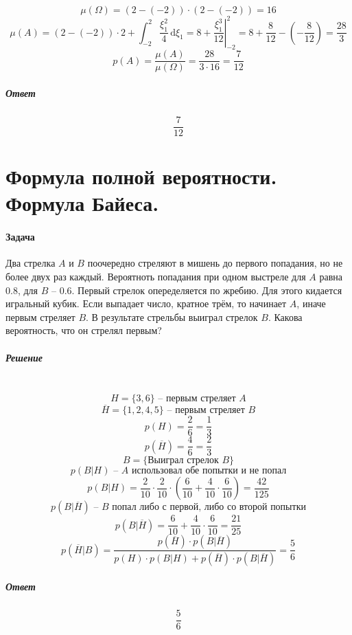 \documentclass[fleqn, 10pt]{article}
\begin{document}
\[\mu(\Omega) = (2 - (-2))\cdot(2 - (-2)) = 16\]
\[\mu(A) = (2 - (-2))\cdot 2 + \int_{-2}^{2}\frac{\xi_1^2}{4}\,\mathrm{d}\xi_1 = 8 + \left.\frac{\xi_1^3}{12}\right|_{-2}^2 = 8 + \frac{8}{12} - (-\frac{8}{12}) = \frac{28}{3}\]
\[p(A) = \frac{\mu(A)}{\mu(\Omega)} = \frac{28}{3\cdot16} = \frac{7}{12}\]
\subparagraph{Ответ}
\[\frac{7}{12}\]
\newpage

\section{Формула полной вероятности. Формула Байеса.}
\paragraph{Задача}
Два стрелка \(A\) и \(B\) поочередно стреляют в мишень до первого попадания, но не более двух раз каждый. Вероятноть попадания при одном выстреле для \(A\) равна \(0.8\), для \(B\) -- \(0.6\). Первый стрелок опеределяется по жребию. Для этого кидается игральный кубик. Если выпадает число, кратное трём, то начинает \(A\), иначе первым стреляет \(B\). В результате стрельбы выиграл стрелок \(B\). Какова вероятность, что он стрелял первым?
\subparagraph{Решение} \mbox{} \\
\[H = \{3, 6\} \text{ -- первым стреляет \(A\)} \] 
\[\overline{H} = \{1, 2, 4, 5\}  \text{ -- первым стреляет \(B\)} \]
\[p(H) = \frac{2}{6} = \frac{1}{3} \]
\[p(\overline{H}) = \frac{4}{6} = \frac{2}{3} \]
\[B = \{\text{Выиграл стрелок \(B\)}\}\]
\[p(B|H) \text{ -- \(A\) использовал обе попытки и не попал}\]
\[p(B|H) = \frac{2}{10}\cdot\frac{2}{10}\cdot(\frac{6}{10} + \frac{4}{10}\cdot\frac{6}{10}) = \frac{42}{125} \]
\[p(B|\overline{H}) \text{ -- \(B\) попал либо с первой, либо со второй попытки}\]
\[p(B|\overline{H}) = \frac{6}{10} + \frac{4}{10}\cdot\frac{6}{10} = \frac{21}{25}\]
\[p(\overline{H}|B) = \frac{p(\overline{H})\cdot p(B|\overline{H})}{p(H)\cdot p(B|H) + p(\overline{H})\cdot p(B|\overline{H})} = \frac{5}{6} \]
\subparagraph{Ответ}
\[\frac{5}{6}\]
\newpage
\end{document}
